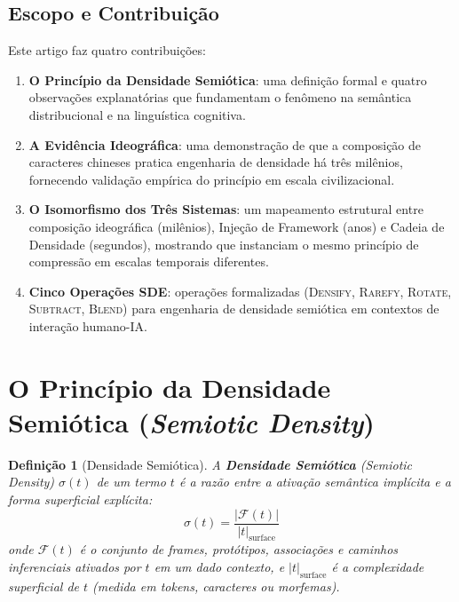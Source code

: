 \documentclass[12pt,a4paper]{article}
\newtheorem{definition}{Definição}[section]
\begin{document}
\subsection{Escopo e Contribuição}

Este artigo faz quatro contribuições:

\begin{enumerate}
  \item \textbf{O Princípio da Densidade Semiótica}: uma definição formal e quatro observações explanatórias que fundamentam o fenômeno na semântica distribucional e na linguística cognitiva.
  \item \textbf{A Evidência Ideográfica}: uma demonstração de que a composição de caracteres chineses pratica engenharia de densidade há três milênios, fornecendo validação empírica do princípio em escala civilizacional.
  \item \textbf{O Isomorfismo dos Três Sistemas}: um mapeamento estrutural entre composição ideográfica (milênios), Injeção de Framework (anos) e Cadeia de Densidade (segundos), mostrando que instanciam o mesmo princípio de compressão em escalas temporais diferentes.
  \item \textbf{Cinco Operações SDE}: operações formalizadas (\textsc{Densify}, \textsc{Rarefy}, \textsc{Rotate}, \textsc{Subtract}, \textsc{Blend}) para engenharia de densidade semiótica em contextos de interação humano-IA.
\end{enumerate}


\section{O Princípio da Densidade Semiótica (\textit{Semiotic Density})}
\label{sec:principle}

\begin{definition}[Densidade Semiótica]
\label{def:semiotic-density}
A \textbf{Densidade Semiótica} (\textit{Semiotic Density}) $\sigma(t)$ de um termo $t$ é a razão entre a ativação semântica implícita e a forma superficial explícita:
\[
  \sigma(t) = \frac{|\mathcal{F}(t)|}{|t|_{\text{surface}}}
\]
onde $\mathcal{F}(t)$ é o conjunto de \textit{frames}, protótipos, associações e caminhos inferenciais ativados por $t$ em um dado contexto, e $|t|_{\text{surface}}$ é a complexidade superficial de $t$ (medida em tokens, caracteres ou morfemas).
\end{definition}
\end{document}
